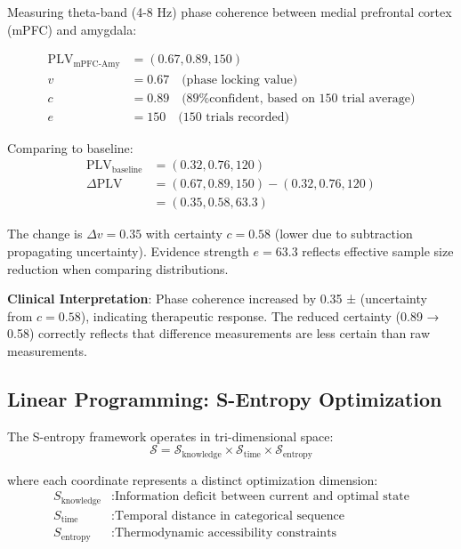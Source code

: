 \begin{example}
Measuring theta-band (4-8 Hz) phase coherence between medial prefrontal cortex (mPFC) and amygdala:

\begin{align}
\text{PLV}_{\text{mPFC-Amy}} &= (0.67, 0.89, 150) \\
v &= 0.67 \quad \text{(phase locking value)} \\
c &= 0.89 \quad \text{(89\% confident, based on 150 trial average)} \\
e &= 150 \quad \text{(150 trials recorded)}
\end{align}

Comparing to baseline:
\begin{align}
\text{PLV}_{\text{baseline}} &= (0.32, 0.76, 120) \\
\Delta \text{PLV} &= (0.67, 0.89, 150) - (0.32, 0.76, 120) \\
&= (0.35, 0.58, 63.3)
\end{align}

The change is $\Delta v = 0.35$ with certainty $c = 0.58$ (lower due to subtraction propagating uncertainty). Evidence strength $e = 63.3$ reflects effective sample size reduction when comparing distributions.

\textbf{Clinical Interpretation}: Phase coherence increased by 0.35 ± (uncertainty from $c = 0.58$), indicating therapeutic response. The reduced certainty (0.89 → 0.58) correctly reflects that difference measurements are less certain than raw measurements.
\end{example}

\subsection{Linear Programming: S-Entropy Optimization}

\begin{definition}
The S-entropy framework operates in tri-dimensional space:
\begin{equation}
\mathcal{S} = \mathcal{S}_{\text{knowledge}} \times \mathcal{S}_{\text{time}} \times \mathcal{S}_{\text{entropy}}
\end{equation}

where each coordinate represents a distinct optimization dimension:
\begin{align}
S_{\text{knowledge}} &: \text{Information deficit between current and optimal state} \\
S_{\text{time}} &: \text{Temporal distance in categorical sequence} \\
S_{\text{entropy}} &: \text{Thermodynamic accessibility constraints}
\end{align}
\end{definition}


